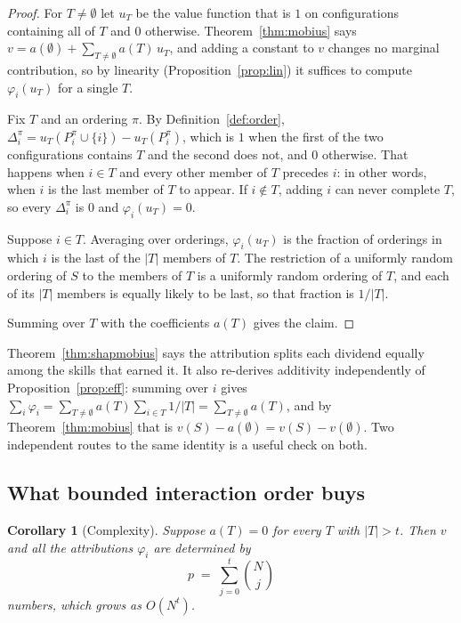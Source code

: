 \documentclass[11pt]{article}
\theoremstyle{plain}
\newtheorem{corollary}[theorem]{Corollary}
\theoremstyle{definition}
\theoremstyle{remark}
\newcommand{\lift}{v(S) - v(\emptyset)}
\begin{document}
\begin{proof}
For $T \neq \emptyset$ let $u_T$ be the value function that is $1$ on configurations containing all of $T$ and $0$ otherwise. Theorem~\ref{thm:mobius} says $v = a(\emptyset) + \sum_{T \neq \emptyset} a(T)\, u_T$, and adding a constant to $v$ changes no marginal contribution, so by linearity (Proposition~\ref{prop:lin}) it suffices to compute $\varphi_i(u_T)$ for a single $T$.

Fix $T$ and an ordering $\pi$. By Definition~\ref{def:order}, $\Delta_i^{\pi} = u_T(P_i^\pi \cup \{i\}) - u_T(P_i^\pi)$, which is $1$ when the first of the two configurations contains $T$ and the second does not, and $0$ otherwise. That happens when $i \in T$ and every other member of $T$ precedes $i$: in other words, when $i$ is the last member of $T$ to appear. If $i \notin T$, adding $i$ can never complete $T$, so every $\Delta_i^\pi$ is $0$ and $\varphi_i(u_T) = 0$.

Suppose $i \in T$. Averaging over orderings, $\varphi_i(u_T)$ is the fraction of orderings in which $i$ is the last of the $|T|$ members of $T$. The restriction of a uniformly random ordering of $S$ to the members of $T$ is a uniformly random ordering of $T$, and each of its $|T|$ members is equally likely to be last, so that fraction is $1/|T|$.

Summing over $T$ with the coefficients $a(T)$ gives the claim.
\end{proof}

Theorem~\ref{thm:shapmobius} says the attribution splits each dividend equally among the skills that earned it. It also re-derives additivity independently of Proposition~\ref{prop:eff}: summing over $i$ gives $\sum_i \varphi_i = \sum_{T \neq \emptyset} a(T) \sum_{i \in T} 1/|T| = \sum_{T \neq \emptyset} a(T)$, and by Theorem~\ref{thm:mobius} that is $v(S) - a(\emptyset) = \lift$. Two independent routes to the same identity is a useful check on both.

\subsection{What bounded interaction order buys}

\begin{corollary}[Complexity]\label{cor:complexity}
Suppose $a(T) = 0$ for every $T$ with $|T| > t$. Then $v$ and all the attributions $\varphi_i$ are determined by
\[
p \;=\; \sum_{j=0}^{t} \binom{N}{j}
\]
numbers, which grows as $O(N^t)$.
\end{corollary}
\end{document}
